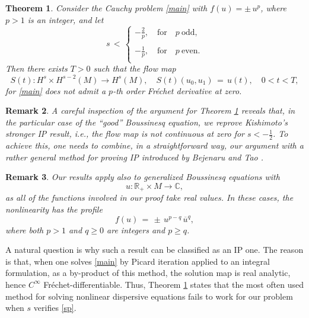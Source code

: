 \documentclass{amsart}
\newtheorem{theorem}{Theorem}[section]
\newtheorem{remark}[theorem]{Remark}
\begin{document}
\begin{theorem}
Consider the Cauchy problem \eqref{main} with  $f(u)=\pm\, u^p$, where $p>1$ is an integer, and let 
\begin{equation}
s\,<\,\left\{
\begin{array}{l}
-\frac{2}{p}, \quad \text{for} \quad p \ \text{odd},\\
\\
-\frac{1}{p}, \quad \text{for} \quad p \ \text{even}.\\
\end{array}\right.
\label{sp}
\end{equation} 
Then there exists $T>0$ such that the flow map
\begin{equation}
S(t):  H^{s} \times H^{s-2}(M) \to H^{s}(M), \quad S(t)(u_0,u_1)\,=\,u(t), \quad 0< t < T,
\label{solmap}
\end{equation}
for \eqref{main} does not admit a $p$-th order Fr\'{e}chet derivative at zero.
\label{mainth}
\end{theorem}

\begin{remark}
A careful inspection of the argument for Theorem \ref{mainth} reveals that, in the particular case of the ``good'' Boussinesq equation, we reprove Kishimoto's \cite{K12} stronger IP result, i.e., the flow map is not continuous at zero for $s<-\frac 12$. To achieve this, one needs to combine, in a straightforward way, our argument with a rather general method for proving IP introduced by Bejenaru and Tao \cite{BT06}.
\end{remark}

\begin{remark}
Our results apply also to generalized Boussinesq equations with
\[
u: \mathbb{R}_+\times M \to \mathbb{C},
\]
as all of the functions involved in our proof take real values. In these cases, the nonlinearity has the profile
\[
f(u)\,=\,\pm\,u^{p-q}\,\overline{u}^q,
\]
where both $p>1$ and $q\geq 0$ are integers and $p\geq q$. 
\end{remark}

A natural question is why such a result can be classified as an IP one. The reason is that, when one solves \eqref{main} by Picard iteration applied to an integral formulation, as a by-product of this method, the solution map is real analytic, hence $C^\infty$ Fr\'{e}chet-differentiable. Thus, Theorem \ref{mainth} states that the most often used method for solving nonlinear dispersive equations fails to work for our problem when $s$ verifies \eqref{sp}.
\end{document}
